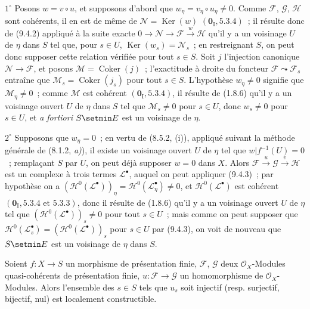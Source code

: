 $1^\circ$ Posons $w=v\circ u$, et supposons d'abord que
$w_\eta=v_\eta\circ u_\eta\neq0$. Comme $\mathcal F$, $\mathcal G$,
$\mathcal H$ sont cohérents, il en est de même de
$\mathcal N=\operatorname{Ker}(w)$ $(\mathbf 0_{\mathrm I},5.3.4)$~; il
résulte donc de (9.4.2) appliqué à la suite exacte
$0\to\mathcal N\to\mathcal F\xrightarrow{w}\mathcal H$ qu'il y a un
voisinage $U$ de $\eta$ dans $S$ tel que, pour $s\in U$,
$\operatorname{Ker}(w_s)=\mathcal N_s$~; en restreignant $S$, on peut donc
supposer cette relation vérifiée pour tout $s\in S$. Soit $j$ l'injection
canonique $\mathcal N\to\mathcal F$, et posons
$\mathcal M=\operatorname{Coker}(j)$~; l'exactitude à droite du foncteur
$\mathcal F\leadsto\mathcal F_s$ entraîne que
$\mathcal M_s=\operatorname{Coker}(j_s)$ pour tout $s\in S$. L'hypothèse
$w_\eta\neq0$ signifie que $\mathcal M_\eta\neq0$~; comme $\mathcal M$ est
cohérent $(\mathbf 0_{\mathrm I},5.3.4)$, il résulte de (1.8.6) qu'il y a un
voisinage ouvert $U$ de $\eta$ dans $S$ tel que $\mathcal M_s\neq0$ pour
$s\in U$, donc $w_s\neq0$ pour $s\in U$, et \emph{a fortiori} $S\setmin E$ est un
voisinage de $\eta$.

$2^\circ$ Supposons que $w_\eta=0$~; en vertu de (8.5.2, (i)), appliqué
suivant la méthode générale de (8.1.2, \emph{a)}), il existe un voisinage
ouvert $U$ de $\eta$ tel que $w|f^{-1}(U)=0$~; remplaçant $S$ par $U$, on peut
déjà supposer $w=0$ dans $X$. Alors
$\mathcal F\xrightarrow{u}\mathcal G\xrightarrow{v}\mathcal H$ est un
complexe à trois termes $\mathcal L^\bullet$, auquel on peut appliquer
(9.4.3)~; par hypothèse on a
$(\mathcal H^0(\mathcal L^\bullet))_\eta=
\mathcal H^0(\mathcal L^\bullet_\eta)\neq0$, et
$\mathcal H^0(\mathcal L^\bullet)$ est cohérent
$(\mathbf 0_{\mathrm I},5.3.4\text{ et }5.3.3)$, donc il résulte de (1.8.6)
qu'il y a un voisinage ouvert $U$ de $\eta$ tel que
$(\mathcal H^0(\mathcal L^\bullet))_s\neq0$ pour tout $s\in U$~; mais comme
on peut supposer que
$\mathcal H^0(\mathcal L_s^\bullet)=(\mathcal H^0(\mathcal L^\bullet))_s$
pour $s\in U$ par (9.4.3), on voit de nouveau que $S\setmin E$ est un voisinage de
$\eta$ dans $S$.


\begin{corollary}[9.4.5]
\label{IV.9.4.5-fr}
Soient $f:X\to S$ un morphisme de présentation finie, $\mathcal F$,
$\mathcal G$ deux $\mathcal O_X$-Modules quasi-cohérents de présentation finie,
$u:\mathcal F\to\mathcal G$ un homomorphisme de $\mathcal O_X$-Modules.
Alors l'ensemble des $s\in S$ tels que $u_s$ soit injectif
\textnormal{(resp.} surjectif, bijectif, nul\textnormal{)} est localement
constructible.
\end{corollary}

